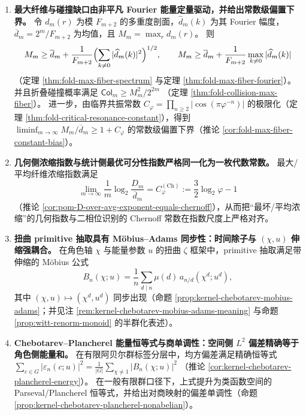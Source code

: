 \begin{enumerate}
  \item \textbf{最大纤维与碰撞缺口由非平凡 Fourier 能量定量驱动，并给出常数级偏置下界。}
  令 \(d_m(r)\) 为模 \(F_{m+2}\) 的多重度剖面，\(\widehat d_m(k)\) 为其 Fourier 幅度，\(\overline d_m=2^m/F_{m+2}\) 为均值，且 \(M_m=\max_r d_m(r)\)。
  则
  \[
  M_m\ge \overline d_m+\frac{1}{F_{m+2}}\Bigl(\sum_{k\ne 0}|\widehat d_m(k)|^2\Bigr)^{1/2},
  \qquad
  M_m\ge \overline d_m+\frac{1}{F_{m+2}}\max_{k\ne 0}|\widehat d_m(k)|
  \]
  （定理 \ref{thm:fold-max-fiber-spectrum} 与定理 \ref{thm:fold-max-fiber-fourier}）。
  并且折叠碰撞概率满足
  \(
  \mathsf{Col}_m\ge M_m^2/2^{2m}
  \)
  （定理 \ref{thm:fold-collision-max-fiber}）。
  进一步，由临界共振常数 \(C_\varphi=\prod_{n\ge 2}|\cos(\pi\varphi^{-n})|\) 的极限化（定理 \ref{thm:fold-critical-resonance-constant}），得到
  \(\liminf_{m\to\infty}M_m/\overline d_m\ge 1+C_\varphi\) 的常数级偏置下界（推论 \ref{cor:fold-max-fiber-constant-bias}）。

  \item \textbf{几何侧浓缩指数与统计侧最优可分性指数严格同一化为一枚代数常数。}
  最大/平均纤维浓缩指数满足
  \[
  \boxed{\ \lim_{m\to\infty}\frac{1}{m}\log_2\frac{D_m}{\overline d_m}=C_\varphi^{(\mathrm{Ch})}:=\frac32\log_2\varphi-1\ }
  \]
  （推论 \ref{cor:pom-D-over-avg-exponent-equals-chernoff}），从而把“最坏/平均浓缩”的几何指数与二相位识别的 Chernoff 常数在指数尺度上严格对齐。

  \item \textbf{扭曲 primitive 抽取具有 Möbius--Adams 同步性：时间除子与 \texorpdfstring{$(\chi,u)$}{(chi,u)} 伸缩强耦合。}
  在角色轴 \(\chi\) 与能量参数 \(u\) 的扭曲 \(\zeta\) 框架中，primitive 抽取满足带伸缩的 Möbius 公式
  \[
  B_n(\chi;u)=\frac{1}{n}\sum_{d\mid n}\mu(d)\,a_{n/d}(\chi^d;u^d),
  \]
  其中 \((\chi,u)\mapsto(\chi^d,u^d)\) 同步出现（命题 \ref{prop:kernel-chebotarev-mobius-adams}；并见注 \ref{rem:kernel-chebotarev-mobius-adams-meaning} 与命题 \ref{prop:witt-renorm-monoid} 的半群化表述）。

  \item \textbf{Chebotarev--Plancherel 能量恒等式与商单调性：空间侧 \texorpdfstring{$L^2$}{L2} 偏差精确等于角色侧能量和。}
  在有限阿贝尔群标签分层中，均方偏差满足精确恒等式
  \(
  \sum_{c\in G}|\varepsilon_n(c;u)|^2=\frac{1}{|G|}\sum_{\chi\ne 1}|B_n(\chi;u)|^2
  \)
  （推论 \ref{cor:kernel-chebotarev-plancherel-energy}）。
  在一般有限群口径下，上式提升为类函数空间的 Parseval/Plancherel 恒等式，并给出对商映射的偏差单调性（命题 \ref{prop:kernel-chebotarev-plancherel-nonabelian}）。


\end{enumerate}
